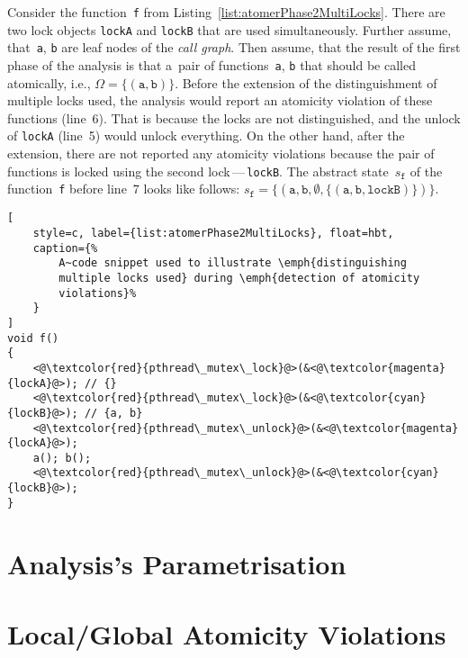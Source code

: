 \begin{example}
    Consider the function~\texttt{f} from
    Listing~\ref{list:atomerPhase2MultiLocks}. There are two lock objects
    \texttt{lockA} and \texttt{lockB} that are used simultaneously.
    Further assume, that~\texttt{a}, \texttt{b} are leaf nodes of the
    \emph{call graph}. Then assume, that the result of the first
    phase of the analysis is that a~pair of functions~\texttt{a},
    \texttt{b} that should be called atomically, i.e., $ \Omega =
    {\{(\mathtt{a}, \mathtt{b})\}} $. Before the extension of
    the distinguishment of multiple locks used, the analysis
    would report an atomicity violation of these functions (line~6).
    That is because the locks are not distinguished, and the
    unlock of \texttt{lockA} (line~5) would unlock everything.
    On the other hand, after the extension, there are not reported
    any atomicity violations because the pair of functions is
    locked using the second lock\,---\,\texttt{lockB}. The abstract
    state~$ s_\mathtt{f} $ of the function~\texttt{f} before
    line~7 looks like follows: $ s_\mathtt{f} = \{{(\mathtt{a},
    \mathtt{b}, \emptyset, \{(\mathtt{a}, \mathtt{b},
    \mathtt{lockB})\})}\} $.
\end{example}

\begin{lstlisting}[
    style=c, label={list:atomerPhase2MultiLocks}, float=hbt,
    caption={%
        A~code snippet used to illustrate \emph{distinguishing
        multiple locks used} during \emph{detection of atomicity
        violations}%
    }
]
void f()
{
    <@\textcolor{red}{pthread\_mutex\_lock}@>(&<@\textcolor{magenta}{lockA}@>); // {}
    <@\textcolor{red}{pthread\_mutex\_lock}@>(&<@\textcolor{cyan}{lockB}@>); // {a, b}
    <@\textcolor{red}{pthread\_mutex\_unlock}@>(&<@\textcolor{magenta}{lockA}@>);
    a(); b();
    <@\textcolor{red}{pthread\_mutex\_unlock}@>(&<@\textcolor{cyan}{lockB}@>);
}
\end{lstlisting}


\section{Analysis's Parametrisation}
\label{sec:proposalParametr}


\section{Local/Global Atomicity Violations}
\label{sec:proposalLocalGlobalViols}



